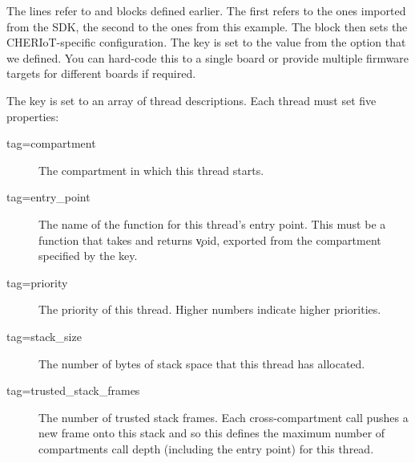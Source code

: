 The  lines refer to  and  blocks defined earlier.
The first refers to the ones imported from the SDK, the second to the ones from this example.
The  block then sets the CHERIoT-specific configuration.
The  key is set to the value from the option that we defined.
You can hard-code this to a single board or provide multiple firmware targets for different boards if required.

The  key is set to an array of thread descriptions.
Each thread must set five properties:

\begin{description}
	\item[tag=compartment]{The compartment in which this thread starts.}
	\item[tag=entry_point]{The name of the function for this thread's entry point.
		This must be a function that takes and returns \c{void}, exported from the compartment specified by the  key.}
	\item[tag=priority]{The priority of this thread.
		Higher numbers indicate higher priorities.}
	\item[tag=stack_size]{The number of bytes of stack space that this thread has allocated.}
	\item[tag=trusted_stack_frames]{The number of trusted stack frames.
		Each cross-compartment call pushes a new frame onto this stack and so this defines the maximum number of compartments call depth (including the entry point) for this thread.}
\end{description}
